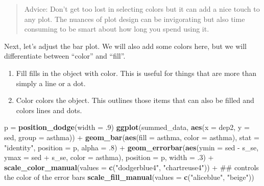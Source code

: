 \documentclass[]{tufte-book}
\newenvironment{Shaded}{}{}
\newcommand{\KeywordTok}[1]{\textcolor[rgb]{0.00,0.44,0.13}{\textbf{#1}}}
\newcommand{\DataTypeTok}[1]{\textcolor[rgb]{0.56,0.13,0.00}{#1}}
\newcommand{\DecValTok}[1]{\textcolor[rgb]{0.25,0.63,0.44}{#1}}
\newcommand{\StringTok}[1]{\textcolor[rgb]{0.25,0.44,0.63}{#1}}
\newcommand{\OperatorTok}[1]{\textcolor[rgb]{0.40,0.40,0.40}{#1}}
\newcommand{\NormalTok}[1]{#1}
\providecommand{\tightlist}{%
  \setlength{\itemsep}{0pt}\setlength{\parskip}{0pt}}
\theoremstyle{definition}
\theoremstyle{definition}
\theoremstyle{remark}
\begin{document}
\begin{quote}
Advice: Don't get too lost in selecting colors but it can add a nice
touch to any plot. The nuances of plot design can be invigorating but
also time consuming to be smart about how long you spend using it.
\end{quote}

Next, let's adjust the bar plot. We will also add some colors here, but
we will differentiate between ``color'' and ``fill''.

\begin{enumerate}
\def\labelenumi{\arabic{enumi}.}
\tightlist
\item
  Fill fills in the object with color. This is useful for things that
  are more than simply a line or a dot.
\item
  Color colors the object. This outlines those items that can also be
  filled and colors lines and dots.
\end{enumerate}

\begin{Shaded}
\begin{Highlighting}[]
\NormalTok{p =}\StringTok{ }\KeywordTok{position_dodge}\NormalTok{(}\DataTypeTok{width =}\NormalTok{ .}\DecValTok{9}\NormalTok{)}
\KeywordTok{ggplot}\NormalTok{(summed_data, }\KeywordTok{aes}\NormalTok{(}\DataTypeTok{x =}\NormalTok{ dep2, }\DataTypeTok{y =}\NormalTok{ sed, }\DataTypeTok{group =}\NormalTok{ asthma)) }\OperatorTok{+}
\StringTok{  }\KeywordTok{geom_bar}\NormalTok{(}\KeywordTok{aes}\NormalTok{(}\DataTypeTok{fill =}\NormalTok{ asthma, }\DataTypeTok{color =}\NormalTok{ asthma), }
           \DataTypeTok{stat =} \StringTok{"identity"}\NormalTok{, }
           \DataTypeTok{position =}\NormalTok{ p,}
           \DataTypeTok{alpha =}\NormalTok{ .}\DecValTok{8}\NormalTok{) }\OperatorTok{+}
\StringTok{  }\KeywordTok{geom_errorbar}\NormalTok{(}\KeywordTok{aes}\NormalTok{(}\DataTypeTok{ymin =}\NormalTok{ sed }\OperatorTok{-}\StringTok{ }\NormalTok{s_se, }\DataTypeTok{ymax =}\NormalTok{ sed }\OperatorTok{+}\StringTok{ }\NormalTok{s_se,}
                    \DataTypeTok{color =}\NormalTok{ asthma), }
                \DataTypeTok{position =}\NormalTok{ p,}
                \DataTypeTok{width =}\NormalTok{ .}\DecValTok{3}\NormalTok{) }\OperatorTok{+}
\StringTok{  }\KeywordTok{scale_color_manual}\NormalTok{(}\DataTypeTok{values =} \KeywordTok{c}\NormalTok{(}\StringTok{"dodgerblue4"}\NormalTok{, }\StringTok{"chartreuse4"}\NormalTok{)) }\OperatorTok{+}\StringTok{   }\NormalTok{## controls the color of the error bars}
\StringTok{  }\KeywordTok{scale_fill_manual}\NormalTok{(}\DataTypeTok{values =} \KeywordTok{c}\NormalTok{(}\StringTok{"aliceblue"}\NormalTok{, }\StringTok{"beige"}\NormalTok{))}
\end{Highlighting}
\end{Shaded}
\end{document}
